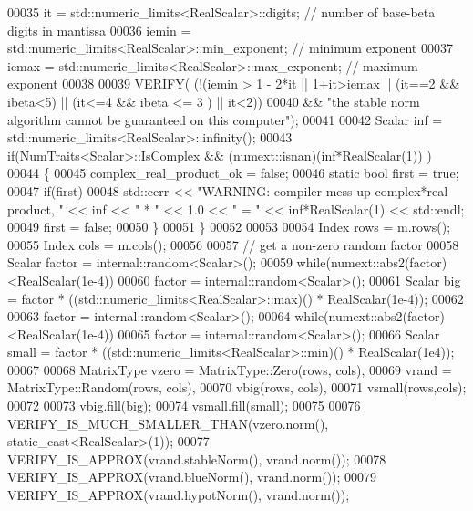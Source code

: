\begin{DoxyCode}
00035     it    = std::numeric\_limits<RealScalar>::digits;        \textcolor{comment}{// number of base-beta digits in mantissa}
00036     iemin = std::numeric\_limits<RealScalar>::min\_exponent;  \textcolor{comment}{// minimum exponent}
00037     iemax = std::numeric\_limits<RealScalar>::max\_exponent;  \textcolor{comment}{// maximum exponent}
00038 
00039     VERIFY( (!(iemin > 1 - 2*it || 1+it>iemax || (it==2 && ibeta<5) || (it<=4 && ibeta <= 3 ) || it<2))
00040            && \textcolor{stringliteral}{"the stable norm algorithm cannot be guaranteed on this computer"});
00041     
00042     Scalar inf = std::numeric\_limits<RealScalar>::infinity();
00043     \textcolor{keywordflow}{if}(\hyperlink{group___core___module_struct_eigen_1_1_num_traits}{NumTraits<Scalar>::IsComplex} && (numext::isnan)(inf*RealScalar(1)) )
00044     \{
00045       complex\_real\_product\_ok = \textcolor{keyword}{false};
00046       \textcolor{keyword}{static} \textcolor{keywordtype}{bool} first = \textcolor{keyword}{true};
00047       \textcolor{keywordflow}{if}(first)
00048         std::cerr << \textcolor{stringliteral}{"WARNING: compiler mess up complex*real product, "} << inf << \textcolor{stringliteral}{" * "} << 1.0 << \textcolor{stringliteral}{" = "} << 
      inf*RealScalar(1) << std::endl;
00049       first = \textcolor{keyword}{false};
00050     \}
00051   \}
00052 
00053 
00054   Index rows = m.rows();
00055   Index cols = m.cols();
00056 
00057   \textcolor{comment}{// get a non-zero random factor}
00058   Scalar factor = internal::random<Scalar>();
00059   \textcolor{keywordflow}{while}(numext::abs2(factor)<RealScalar(1e-4))
00060     factor = internal::random<Scalar>();
00061   Scalar big = factor * ((std::numeric\_limits<RealScalar>::max)() * RealScalar(1e-4));
00062   
00063   factor = internal::random<Scalar>();
00064   \textcolor{keywordflow}{while}(numext::abs2(factor)<RealScalar(1e-4))
00065     factor = internal::random<Scalar>();
00066   Scalar small = factor * ((std::numeric\_limits<RealScalar>::min)() * RealScalar(1e4));
00067 
00068   MatrixType  vzero = MatrixType::Zero(rows, cols),
00069               vrand = MatrixType::Random(rows, cols),
00070               vbig(rows, cols),
00071               vsmall(rows,cols);
00072 
00073   vbig.fill(big);
00074   vsmall.fill(small);
00075 
00076   VERIFY\_IS\_MUCH\_SMALLER\_THAN(vzero.norm(), \textcolor{keyword}{static\_cast<}RealScalar\textcolor{keyword}{>}(1));
00077   VERIFY\_IS\_APPROX(vrand.stableNorm(),      vrand.norm());
00078   VERIFY\_IS\_APPROX(vrand.blueNorm(),        vrand.norm());
00079   VERIFY\_IS\_APPROX(vrand.hypotNorm(),       vrand.norm());

\end{DoxyCode}

